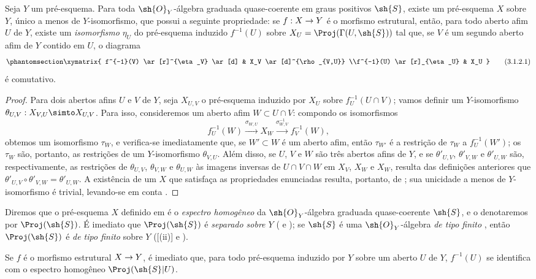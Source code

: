 \documentclass[oneside,10pt]{amsart}
\makeatletter
\newcommand{\ega@arrow}[2]{\mathchoice{#1}{#2}{#2}{#2}}
\renewcommand{\to}{\ega@arrow{\longrightarrow}{\rightarrow}}
\let\EGAOriginalLabel\label
\renewcommand{\label}[1]{\phantomsection\EGAOriginalLabel{#1}}
\makeatother
\begin{document}
\begin{proposition}[3.1.2]
\label{II.3.1.2}
Seja $Y$ um pré-esquema.
Para toda $\sh{O}_Y$-álgebra graduada quase-coerente em graus positivos $\sh{S}$, existe um pré-esquema $X$ sobre $Y$, único a menos de $Y$-isomorfismo, que possui a seguinte propriedade:
se $f:X\to Y$ é o morfismo estrutural, então, para todo aberto afim $U$ de $Y$, existe um \emph{isomorfismo} $\eta_U$ do pré-esquema induzido $f^{-1}(U)$ sobre $X_U=\Proj(\Gamma(U,\sh{S}))$ tal que, se $V$ é um segundo aberto afim de $Y$ contido em $U$, o diagrama
\[
\label{II.3.1.2.1}
  \xymatrix{
    f^{-1}(V) \ar[r]^{\eta_V} \ar[d]
    & X_V \ar[d]^{\rho_{V,U}}
  \\f^{-1}(U) \ar[r]_{\eta_U}
    & X_U
  }
\tag{3.1.2.1}
\]
é comutativo.
\end{proposition}

\begin{proof}
Para dois abertos afins $U$ e $V$ de $Y$, seja $X_{U,V}$ o pré-esquema induzido por $X_U$ sobre $f_U^{-1}(U\cap V)$;
vamos definir um $Y$-isomorfismo $\theta_{U,V}:X_{V,U}\simto X_{U,V}$.
Para isso, consideremos um aberto afim $W\subset U\cap V$:
compondo os isomorfismos
\[
  f_U^{-1}(W)
  \xrightarrow{\sigma_{W,U}} X_W
  \xrightarrow{\sigma_{W,V}^{-1}} f_V^{-1}(W),
\]
obtemos um isomorfismo $\tau_W$, e verifica-se imediatamente que, se $W'\subset W$ é um aberto afim, então $\tau_{W'}$ é a restrição de $\tau_W$ a $f_U^{-1}(W')$;
os $\tau_W$ são, portanto, as restrições de um $Y$-isomorfismo $\theta_{V,U}$.
Além disso, se $U$, $V$ e $W$ são três abertos afins de $Y$, e se $\theta'_{U,V}$, $\theta'_{V,W}$ e $\theta'_{U,W}$ são, respectivamente, as restrições de $\theta_{U,V}$, $\theta_{V,W}$ e $\theta_{U,W}$ às imagens inversas de $U\cap V\cap W$ em $X_V$, $X_W$ e $X_W$, resulta das definições anteriores que $\theta'_{U,V}\circ\theta'_{V,W}=\theta'_{U,W}$.
A existência de um $X$ que satisfaça as propriedades enunciadas resulta, portanto, de ;
sua unicidade a menos de $Y$-isomorfismo é trivial, levando-se em conta .
\end{proof}

\begin{env}[3.1.3]
\label{II.3.1.3}
Diremos que o pré-esquema $X$ definido em  é o \emph{espectro homogêneo} da $\sh{O}_Y$-álgebra graduada quase-coerente $\sh{S}$, e o denotaremos por $\Proj(\sh{S})$.
É imediato que $\Proj(\sh{S})$ é \emph{separado sobre $Y$} ( e );
se $\sh{S}$ é uma $\sh{O}_Y$-álgebra \emph{de tipo finito} , então $\Proj(\sh{S})$ é \emph{de tipo finito} sobre $Y$ ([(ii)] e ).

Se $f$ é o morfismo estrutural $X\to Y$, é imediato que, para todo pré-esquema induzido por $Y$ sobre um aberto $U$ de $Y$, $f^{-1}(U)$ se identifica com o espectro homogêneo $\Proj(\sh{S}|U)$.
\end{env}
\end{document}
